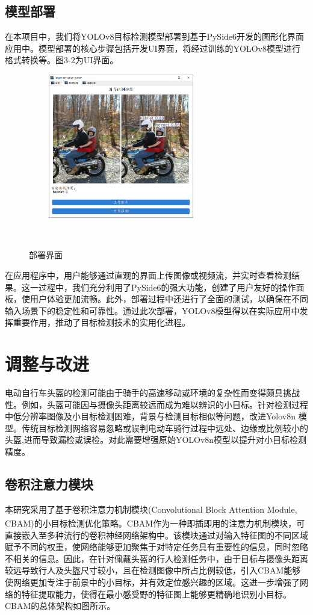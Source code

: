 \documentclass[journal]{IEEEtran}
\numberwithin{figure}{section}%
\begin{document}
\subsection{模型部署}
在本项目中，我们将YOLOv8目标检测模型部署到基于PySide6开发的图形化界面应用中。模型部署的核心步骤包括开发UI界面，将经过训练的YOLOv8模型进行格式转换等。图3-2为UI界面。\par
\begin{figure}[htbp] 

   \centering
   \includegraphics[width=2.5in]{figures/部署页面.png}
   \caption{部署界面} 
   \label{fig:} 
  
\end{figure} 
在应用程序中，用户能够通过直观的界面上传图像或视频流，并实时查看检测结果。这一过程中，我们充分利用了PySide6的强大功能，创建了用户友好的操作面板，使用户体验更加流畅。此外，部署过程中还进行了全面的测试，以确保在不同输入场景下的稳定性和可靠性。通过此次部署，YOLOv8模型得以在实际应用中发挥重要作用，推动了目标检测技术的实用化进程。\par


\section{调整与改进}
电动自行车头盔的检测可能由于骑手的高速移动或环境的复杂性而变得颇具挑战性。例如，头盔可能因与摄像头距离较远而成为难以辨识的小目标。针对检测过程中低分辨率图像及小目标检测困难，背景与检测目标相似等问题，改进Yolov8n 模型。传统目标检测网络容易忽略或误判电动车骑行过程中远处、边缘或比例较小的头盔,进而导致漏检或误检。对此需要增强原始YOLOv8n模型以提升对小目标检测精度。\par
\subsection{卷积注意力模块}
本研究采用了基于卷积注意力机制模块(Convolutional Block Attention Module, CBAM)\textsuperscript{\cite{1}}的小目标检测优化策略。CBAM作为一种即插即用的注意力机制模块，可直接嵌入至多种流行的卷积神经网络架构中。该模块通过对输入特征图的不同区域赋予不同的权重，使网络能够更加聚焦于对特定任务具有重要性的信息，同时忽略不相关的信息。因此，在针对佩戴头盔的行人检测任务中，由于目标与摄像头距离较远导致行人及头盔尺寸较小，且在检测图像中所占比例较低，引入CBAM能够使网络更加专注于前景中的小目标，并有效定位感兴趣的区域。这进一步增强了网络的特征提取能力，使得在最小感受野的特征图上能够更精确地识别小目标。CBAM的总体架构如图所示。\par
\end{document}
